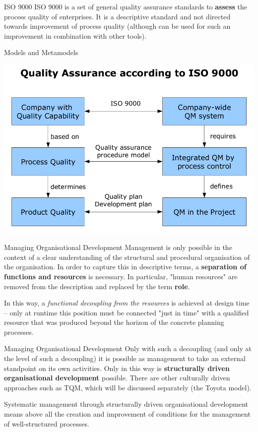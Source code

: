 \documentclass{beamer}
\begin{document}
\begin{frame}{ISO 9000}
ISO 9000 is a set of general quality assurance standards to \textbf{assess}
the process quality of enterprises. It is a descriptive standard and not
directed towards improvement of process quality (although can be used for such
an improvement in combination with other tools).
\end{frame}

\begin{frame}{Models and Metamodels}
\begin{center}
  \includegraphics[width=\textwidth]{1.png}
\end{center}
\end{frame}

\begin{frame}{Managing Organisational Development}
Management is only possible in the context of a clear understanding of the
structural and procedural organisation of the organisation.  In order to
capture this in descriptive terms, a \textbf{separation of functions and
  resources} is necessary. In particular, "human resources" are removed from
the description and replaced by the term \textbf{role}.

In this way, a \emph{functional decoupling from the resources} is achieved at
design time -- only at runtime this position must be connected "just in time"
with a qualified resource that was produced beyond the horizon of the concrete
planning processes.
\end{frame}
\begin{frame}{Managing Organisational Development}
Only with such a decoupling (and only at the level of such a decoupling) it is
possible as management to take an external standpoint on its own activities.
Only in this way is \textbf{structurally driven organisational development}
possible. There are other culturally driven approaches such as TQM, which will
be discussed separately (the Toyota model).

Systematic management through structurally driven organisational development
means above all the creation and improvement of conditions for the management
of well-structured processes.
\end{frame}
\end{document}

